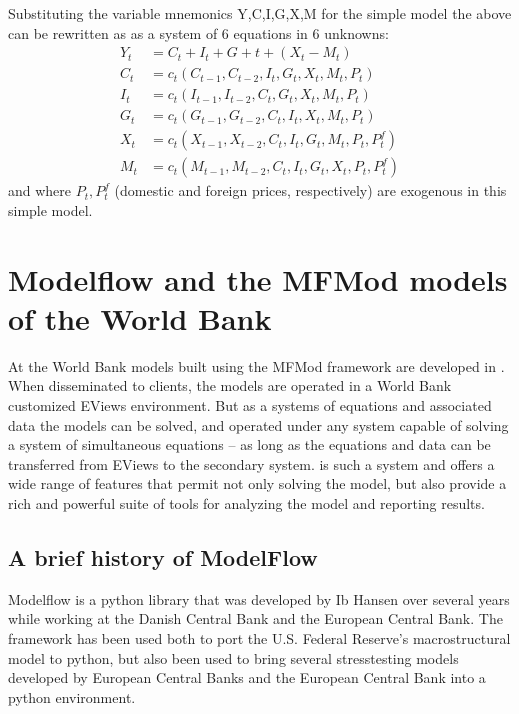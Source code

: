 \documentclass[letterpaper,10pt,english]{jupyterBook}
\begin{document}
\sphinxAtStartPar
Substituting the variable mnemonics Y,C,I,G,X,M for the simple model the above can be rewritten as as a system of 6 equations in 6 unknowns:
\begin{align*}
Y_t  &=  C_t+I_t+G+t+ (X_t-M_t) \\
C_t &= c_t(C_{t-1},C_{t-2},I_t,G_t,X_t,M_t,P_t)\\
I_t &= c_t(I_{t-1},I_{t-2},C_t,G_t,X_t,M_t,P_t)\\
G_t &= c_t(G_{t-1},G_{t-2},C_t,I_t,X_t,M_t,P_t)\\
X_t &= c_t(X_{t-1},X_{t-2},C_t,I_t,G_t,M_t,P_t,P^f_t)\\
M_t &= c_t(M_{t-1},M_{t-2},C_t,I_t,G_t,X_t,P_t,P^f_t)
\end{align*}
\sphinxAtStartPar
and where \(P_t, P^f_t\) (domestic and foreign prices, respectively) are exogenous in this simple model.

\sphinxstepscope


\chapter{Modelflow and the MFMod models of the World Bank}
\label{\detokenize{content/02_MacrostructuralModels/MFModAndModelFlow:modelflow-and-the-mfmod-models-of-the-world-bank}}\label{\detokenize{content/02_MacrostructuralModels/MFModAndModelFlow::doc}}
\sphinxAtStartPar
At the World Bank models built using the MFMod framework are developed in . When disseminated to clients, the models are operated in a World Bank customized EViews environment. But as a systems of equations and associated data the models can be solved, and operated under any system capable of solving a system of simultaneous equations – as long as the equations and data can be transferred from EViews to the secondary system.  is such a system and offers a wide range of features that permit not only solving the model, but also provide a rich and powerful suite of tools for analyzing the model and reporting results.


\section{A brief history of ModelFlow}
\label{\detokenize{content/02_MacrostructuralModels/MFModAndModelFlow:a-brief-history-of-modelflow}}
\sphinxAtStartPar
Modelflow is a python library that was developed by Ib Hansen over several years while working at the Danish Central Bank and the European Central Bank. The framework has been used both to port the U.S. Federal Reserve’s macro\sphinxhyphen{}structural  model to python, but also been used to bring several stress\sphinxhyphen{}testing models developed by European Central Banks and the European Central Bank into a python environment.
\end{document}
